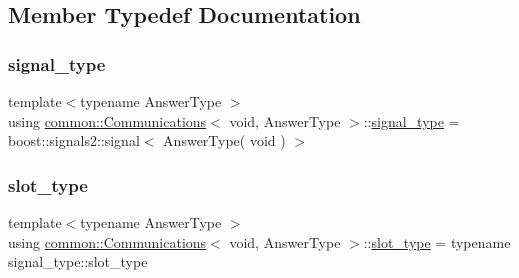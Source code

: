 \subsection{Member Typedef Documentation}
\mbox{\label{classcommon_1_1Communications_3_01void_00_01AnswerType_01_4_aa7d23e7da9af7eb33112dc11fd3ec8aa}} 
\subsubsection{\texorpdfstring{signal\+\_\+type}{signal\_type}}
{\footnotesize\ttfamily template$<$typename Answer\+Type $>$ \\
using \mbox{\hyperlink{classcommon_1_1Communications}{common\+::\+Communications}}$<$ void, Answer\+Type $>$\+::\mbox{\hyperlink{classcommon_1_1Communications_3_01void_00_01AnswerType_01_4_aa7d23e7da9af7eb33112dc11fd3ec8aa}{signal\+\_\+type}} =  boost\+::signals2\+::signal$<$ Answer\+Type( void ) $>$\hspace{0.3cm}{\ttfamily [private]}}

\mbox{\label{classcommon_1_1Communications_3_01void_00_01AnswerType_01_4_ae2ac44b26adf6e9b509a91ad4d2c429a}} 
\subsubsection{\texorpdfstring{slot\+\_\+type}{slot\_type}}
{\footnotesize\ttfamily template$<$typename Answer\+Type $>$ \\
using \mbox{\hyperlink{classcommon_1_1Communications}{common\+::\+Communications}}$<$ void, Answer\+Type $>$\+::\mbox{\hyperlink{classcommon_1_1Communications_3_01void_00_01AnswerType_01_4_ae2ac44b26adf6e9b509a91ad4d2c429a}{slot\+\_\+type}} =  typename signal\+\_\+type\+::slot\+\_\+type\hspace{0.3cm}{\ttfamily [private]}}



